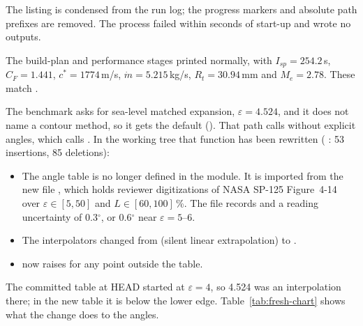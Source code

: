 The listing is condensed from the run log; the progress markers and absolute path prefixes are removed. The process failed within seconds of start-up and wrote no outputs.

The build-plan and performance stages printed normally, with $I_{sp} = 254.2$\,s, $C_F = 1.441$, $c^* = 1774$\,m/s, $\dot m = 5.215$\,kg/s, $R_t = 30.94$\,mm and $M_e = 2.78$. These match .

The benchmark asks for sea-level matched expansion, $\varepsilon = 4.524$, and it does not name a contour method, so it gets the default   (). That path calls  without explicit angles, which calls . In the working tree that function has been rewritten (  : 53 insertions, 85 deletions):

\begin{itemize}
\item The angle table is no longer defined in the module. It is imported from the new file , which holds reviewer digitizations of NASA SP-125 Figure~4-14 over $\varepsilon \in [5, 50]$ and $L \in [60, 100]$\,\%. The file records   and a reading uncertainty of 0.3$^\circ$, or 0.6$^\circ$ near $\varepsilon = 5$--6.
\item The interpolators changed from   (silent linear extrapolation) to .
\item {} now raises  for any point outside the table.
\end{itemize}

The committed table at HEAD started at $\varepsilon = 4$, so 4.524 was an interpolation there; in the new table it is below the lower edge. Table~\ref{tab:fresh-chart} shows what the change does to the angles.

